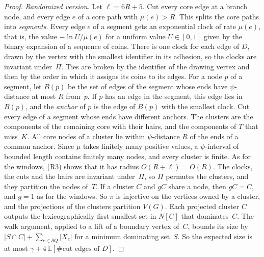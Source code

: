\documentclass[11pt]{article}
\theoremstyle{remark}
\newcommand{\E}{\mathbb{E}}
\begin{document}
\begin{proof}
\emph{Randomized version.} Let $\ell=6R+5$. Cut every core edge at a branch node, and every edge $e$
of a core path with $\mu(e)>R$. This splits the core paths into \emph{segments}. Every edge $e$ of a
segment gets an exponential clock of rate $\mu(e)$, that is, the value $-\ln U/\mu(e)$ for a uniform
value $U\in[0,1]$ given by the binary expansion of a sequence of coins. There is one clock for each
edge of $D$, drawn by the vertex with the smallest identifier in its adhesion, so the clocks are
invariant under~$\Pi$. Ties are broken by the identifier of the drawing vertex and then by the order
in which it assigns its coins to its edges. For
a node $p$ of a segment, let $B(p)$ be the set of edges of the segment whose ends have $\psi$-distance
at most $R$ from~$p$. If $p$ has an edge in the segment, this edge lies in $B(p)$, and the
\emph{anchor} of $p$ is the edge of $B(p)$ with the smallest clock. Cut every edge of a segment whose
ends have different anchors. The clusters are the components of the remaining core with their hairs,
and the components of $T$ that miss~$K$. All core nodes of a cluster lie within $\psi$-distance $R$
of the ends of a common anchor. Since $\mu$ takes finitely many positive values, a $\psi$-interval of
bounded length contains finitely many nodes, and every cluster is finite. As for the windows, (R3) shows that it has radius
$O(R+\ell)=O(R)$. The clocks, the cuts and the hairs are invariant under~$\Pi$, so $\Pi$ permutes
the clusters, and they partition the nodes of~$T$. If a cluster $C$ and $gC$ share a node, then
$gC=C$, and $g=1$ as for the windows. So $\pi$ is injective on the vertices owned by a cluster, and
the projections of the clusters partition $V(G)$. Each projected cluster $C$ outputs the
lexicographically first smallest set in $N[C]$ that dominates~$C$. The walk argument, applied to a
lift of a boundary vertex of~$C$, bounds its size by $|S\cap C|+\sum_{e\in\partial Q}|X_e|$ for a
minimum dominating set~$S$. So the expected size is at most $\gamma+4\,\E[\#\text{cut edges of }D]$.


\end{proof}
\end{document}
